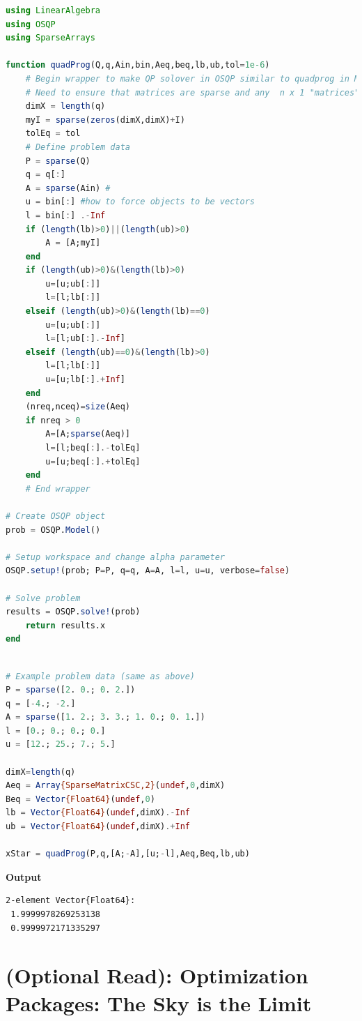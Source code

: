 \begin{lstlisting}[language=Julia,style=mystyle]
using LinearAlgebra
using OSQP
using SparseArrays

function quadProg(Q,q,Ain,bin,Aeq,beq,lb,ub,tol=1e-6)
    # Begin wrapper to make QP solover in OSQP similar to quadprog in Matlab
    # Need to ensure that matrices are sparse and any  n x 1 "matrices" are turned into vectors
    dimX = length(q)
    myI = sparse(zeros(dimX,dimX)+I)
    tolEq = tol
    # Define problem data
    P = sparse(Q)
    q = q[:]
    A = sparse(Ain) #
    u = bin[:] #how to force objects to be vectors
    l = bin[:] .-Inf
    if (length(lb)>0)||(length(ub)>0)
        A = [A;myI] 
    end
    if (length(ub)>0)&(length(lb)>0)
        u=[u;ub[:]]
        l=[l;lb[:]]
    elseif (length(ub)>0)&(length(lb)==0)
        u=[u;ub[:]]
        l=[l;ub[:].-Inf]
    elseif (length(ub)==0)&(length(lb)>0)
        l=[l;lb[:]]
        u=[u;lb[:].+Inf]
    end
    (nreq,nceq)=size(Aeq)
    if nreq > 0
        A=[A;sparse(Aeq)]
        l=[l;beq[:].-tolEq]
        u=[u;beq[:].+tolEq]
    end
    # End wrapper
   
# Create OSQP object
prob = OSQP.Model()

# Setup workspace and change alpha parameter
OSQP.setup!(prob; P=P, q=q, A=A, l=l, u=u, verbose=false)

# Solve problem
results = OSQP.solve!(prob)
    return results.x
end
\end{lstlisting}

\begin{lstlisting}[language=Julia,style=mystyle]

# Example problem data (same as above)
P = sparse([2. 0.; 0. 2.])
q = [-4.; -2.]
A = sparse([1. 2.; 3. 3.; 1. 0.; 0. 1.])
l = [0.; 0.; 0.; 0.]
u = [12.; 25.; 7.; 5.]

dimX=length(q)
Aeq = Array{SparseMatrixCSC,2}(undef,0,dimX)
Beq = Vector{Float64}(undef,0)
lb = Vector{Float64}(undef,dimX).-Inf
ub = Vector{Float64}(undef,dimX).+Inf

xStar = quadProg(P,q,[A;-A],[u;-l],Aeq,Beq,lb,ub)


\end{lstlisting}
\textbf{Output} 
\begin{verbatim}
2-element Vector{Float64}:
 1.9999978269253138
 0.9999972171335297
\end{verbatim}

\section{(Optional Read): Optimization Packages: The Sky is the Limit}


